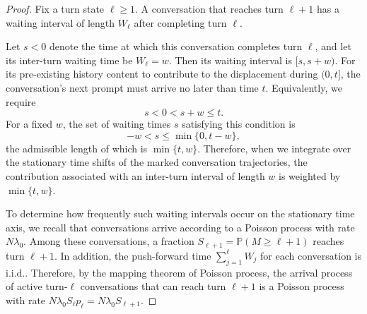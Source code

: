 \documentclass{article}
\theoremstyle{definition}
\newcommand{\E}{\mathbb E}
\newcommand{\pro}{\mathbb P}
\begin{document}
\begin{proof}
    Fix a turn state $\ell\geq1$. A conversation that reaches turn $\ell+1$ has a waiting interval of length $W_\ell$ after completing turn $\ell$. 
    
    Let $s<0$ denote the time at which this conversation completes turn $\ell$, and let its inter-turn waiting time be $W_\ell=w$. Then its waiting interval is $[s,s+w)$. For its pre-existing history content to contribute to the displacement during $(0,t]$, the conversation's next prompt must arrive no later than time $t$. Equivalently, we require
    \begin{equation*}
        s<0<s+w\leq t.
    \end{equation*}
    For a fixed $w$, the set of waiting times $s$ satisfying this condition is
    \begin{equation*}
        -w<s\leq\min\{0,t-w\},
    \end{equation*}
    the admissible length of which is $\min\{t,w\}$. Therefore, when we integrate over the stationary time shifts of the marked conversation trajectories, the contribution associated with an inter-turn interval of length $w$ is weighted by $\min\{t,w\}$. 
    
    To determine how frequently such waiting intervals occur on the stationary time axis, we recall that conversations arrive according to a Poisson process with rate $N\lambda_0$. Among these conversations, a fraction $S_{\ell+1}=\pro(M\geq \ell+1)$ reaches turn $\ell+1$. In addition, the push-forward time $\sum\limits_{j=1}^{\ell} W_j$ for each conversation is i.i.d.. Therefore, by the mapping theorem of Poisson process, the arrival process of active turn-$\ell$ conversations that can reach turn $\ell+1$ is a Poisson process with rate $N\lambda_0 S_\ell p_{\ell} = N\lambda_0 S_{\ell+1}$.
    
    
    
    

\end{proof}
\end{document}
